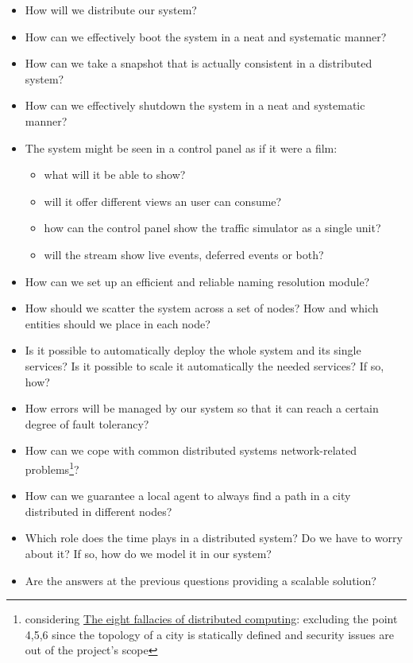 \begin{itemize}
\item How will we distribute our system?
\item How can we effectively boot the system in a neat and systematic manner?
\item How can we take a snapshot that is actually consistent in a distributed
  system?
\item How can we effectively shutdown the system in a neat and systematic
  manner?
\item The system might be seen in a control panel as if it were a film:
  \begin{itemize}
  \item what will it be able to show?
  \item will it offer different views an user can consume?
  \item how can the control panel show the traffic simulator as a
    single unit?
  \item will the stream show live events, deferred events or both?
  \end{itemize}
\item How can we set up an efficient and reliable naming resolution module?
\item How should we scatter the system across a set of nodes? How and which
  entities should we place in each node?
\item Is it possible to automatically deploy the whole system and its single
services? Is it possible to scale it automatically the needed services?
If so, how?
\item How errors will be managed by our system so that it can reach a certain
  degree of fault tolerancy?
\item How can we cope with common distributed systems network-related
  problems\footnote{considering \href{https://blogs.oracle.com/jag/resource/Fallacies.html?cm_mc_uid=82650292107114582847614&cm_mc_sid_50200000=1458564821}{The eight fallacies of distributed computing}: excluding the point 4,5,6
  since the topology of a city is statically defined and security issues are
  out of the project's scope}?
\item How can we guarantee a local agent to always find a path in
a city distributed in different nodes?
\item Which role does the time plays in a distributed system? Do we have to
worry about it? If so, how do we model it in our system?
\item Are the answers at the previous questions providing a scalable solution?
\end{itemize}

